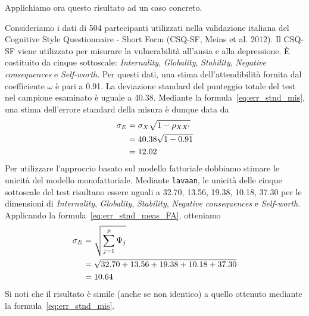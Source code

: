 Applichiamo ora questo risultato ad un caso concreto.

\begin{exmp} 
Consideriamo i dati di 504 partecipanti utilizzati nella validazione italiana del Cognitive Style Questionnaire - Short Form (CSQ-SF, Meins et al. 2012).  Il CSQ-SF viene utilizzato per misurare la vulnerabilità all'ansia e alla depressione.  È costituito da cinque sottoscale: \textit{Internality}, \textit{Globality},	\textit{Stability}, \textit{Negative consequences} e \textit{Self-worth}. 
Per questi dati, una stima dell'attendibilità fornita dal coefficiente $\omega$ è pari a 0.91. La deviazione standard del punteggio totale del test nel campione esaminato è uguale a 40.38. Mediante la formula~\ref{eq:err_stnd_mis}, una stima dell'errore standard della misura è dunque data da
\begin{align}
\sigma_E &= \sigma_X \sqrt{1 -\rho_{XX'}} \notag\\
&= 40.38 \sqrt{1-0.91}\notag\\
&= 12.02\notag
\end{align}
Per utilizzare l'approccio basato sul modello fattoriale dobbiamo stimare le unicità del modello monofattoriale.  Mediante \texttt{lavaan}, le unicità delle cinque sottoscale del test risultano essere uguali a 32.70, 13.56, 19.38, 10.18, 37.30 per le dimensioni di \textit{Internality}, \textit{Globality},	\textit{Stability}, \textit{Negative consequences} e \textit{Self-worth}. Applicando la formula~\ref{eq:err_stnd_meas_FA}, otteniamo
\begin{align}
\sigma_E &= \sqrt{\sum_{j=1}^p \Psi_j} \notag\\
&= \sqrt{32.70 + 13.56 + 19.38 + 10.18 + 37.30}\notag\\
&= 10.64\notag
\end{align}
Si noti che il risultato è simile (anche se non identico) a quello ottenuto mediante la formula~\ref{eq:err_stnd_mis}.
\end{exmp} 



